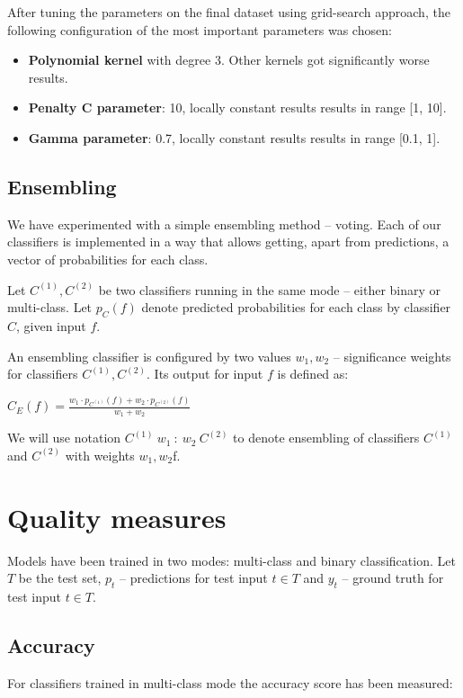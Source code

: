         After tuning the parameters on the final dataset using grid-search approach, the following configuration of the most important parameters was chosen:
        \begin{itemize}
            \item \textbf{Polynomial kernel} with degree 3. Other kernels got significantly worse results.
            \item \textbf{Penalty C parameter}: 10, locally constant results results in range [1, 10].
            \item \textbf{Gamma parameter}: 0.7, locally constant results results in range [0.1, 1].
        \end{itemize}

        \subsection{Ensembling}
        We have experimented with a simple ensembling method -- voting.
        Each of our classifiers is implemented in a way that allows getting,
        apart from predictions, a vector of probabilities for each class.

        Let $C^{(1)}, C^{(2)}$ be two classifiers running in the same mode -- either
        binary or multi-class.
        Let $p_{C}(f)$ denote predicted probabilities for each class by classifier $C$,
        given input $f$.

        An ensembling classifier is configured by two values $w_1, w_2$ -- significance
        weights for classifiers $C^{(1)}, C^{(2)}$. Its output for input $f$ is defined as:
        \begin{center}
        $C_{E}(f) = \frac{w_{1} \cdot p_{C^{(1)}}(f) + w_{2} \cdot p_{C^{(2)}}(f)}{w_{1} + w_{2}}$
        \end{center}

        We will use notation $C^{(1)}\ w_{1}\ :\ w_{2}\ C^{(2)}$ to denote ensembling
        of classifiers $C^{(1)}$ and $C^{(2)}$ with weights $w_{1}, w_{2}$f.


    \section{Quality measures}
        Models have been trained in two modes: multi-class and binary
        classification. Let $T$ be the test set, $p_t$ -- predictions for test input
        $t \in T$ and $y_t$ -- ground truth for test input $t \in T$.
        \subsection*{Accuracy}
        For classifiers trained in multi-class mode the accuracy score has been
        measured:

